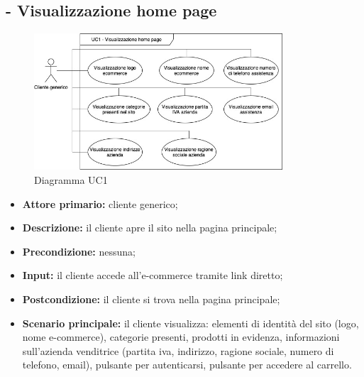 \subsection{ - Visualizzazione home page}
\begin{figure}
    \centering
    \includegraphics[width=25em]{res/images/UC/UC1.jpg}
    \caption{Diagramma UC1}
\end{figure}
\begin{itemize}
    \item \textbf{Attore primario:} cliente generico;
    \item \textbf{Descrizione:} il cliente apre il sito nella pagina principale;
    \item \textbf{Precondizione:} nessuna;
    \item \textbf{Input:} il cliente accede all'e-commerce tramite link diretto;
    \item \textbf{Postcondizione:} il cliente si trova nella pagina principale;
    \item \textbf{Scenario principale:} il cliente visualizza: elementi di identità del sito (logo, nome e-commerce), categorie presenti, prodotti in evidenza, informazioni sull'azienda venditrice (partita iva, indirizzo, ragione sociale, numero di telefono, email), pulsante per autenticarsi, pulsante per accedere al carrello.
\end{itemize}

\stepUserCase
